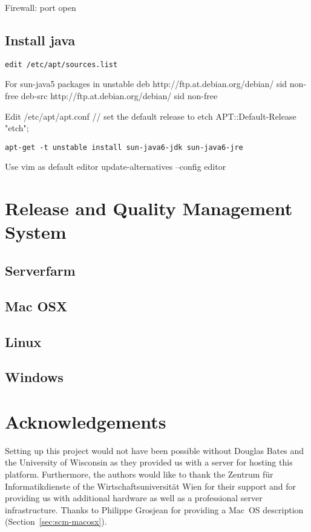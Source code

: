 \documentclass[a4paper]{article}
\begin{document}
Firewall: port open

\subsection{Install java}

\begin{lstlisting}[frame=single, framerule=0.95pt]
edit /etc/apt/sources.list
\end{lstlisting}

For sun-java5 packages in unstable
deb http://ftp.at.debian.org/debian/ sid non-free
deb-src http://ftp.at.debian.org/debian/ sid non-free

Edit /etc/apt/apt.conf
// set the default release to etch
APT::Default-Release "etch";

\begin{lstlisting}[frame=single, framerule=0.95pt]
apt-get -t unstable install sun-java6-jdk sun-java6-jre
\end{lstlisting}

Use vim as default editor
update-alternatives --config editor


\section{Release and Quality Management System}
\label{sec:release_and_QM}

\subsection{Serverfarm}
\subsection{Mac OSX}
\subsection{Linux}
\subsection{Windows}

\section{Acknowledgements}

Setting up this project would not have been possible without Douglas
Bates and the University of Wisconsin as they provided us with a
server for hosting this platform. Furthermore, 
the authors would like to thank the Zentrum f\"ur Informatikdienste  
of the Wirtschaftsuniversit\"at Wien for
their support and for providing us with additional hardware as well as a
professional server infrastructure. 
Thanks to Philippe Grosjean for
providing a Mac~OS description (Section~\ref{sec:scm-macosx}).



\end{document}
